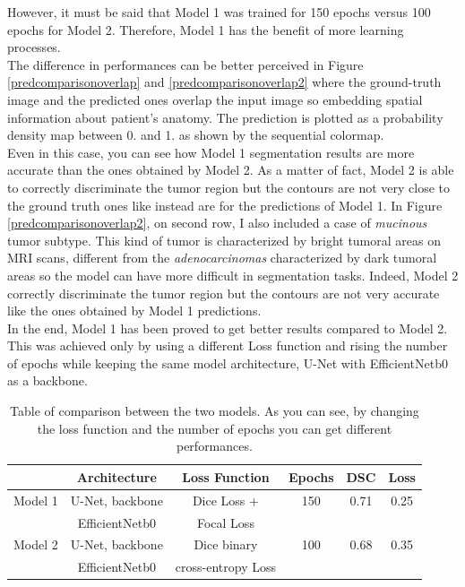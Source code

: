 \documentclass{standalone}
\begin{document}
However, it must be said that Model 1 was trained for 150 epochs versus 100 epochs for Model 2.
Therefore, Model 1 has the benefit of more learning processes.
\\
The difference in performances can be better perceived in Figure \ref{predcomparisonoverlap} and \ref{predcomparisonoverlap2} where the ground-truth image and the predicted ones overlap the input image so embedding spatial information about patient's anatomy.
The prediction is plotted as a probability density map between 0. and 1. as shown by the sequential colormap.
\\
Even in this case, you can see how Model 1 segmentation results are more accurate than the ones obtained by Model 2.
As a matter of fact, Model 2 is able to correctly discriminate the tumor region but the contours are not very close to the ground truth ones like instead are for the predictions of Model 1.
In Figure \ref{predcomparisonoverlap2}, on second row, I also included a case of \textit{mucinous} tumor subtype.
This kind of tumor is characterized by bright tumoral areas on MRI scans, different from the \textit{adenocarcinomas} characterized by dark tumoral areas so the model can have more difficult in segmentation tasks.
Indeed, Model 2 correctly discriminate the tumor region but the contours are not very accurate like the ones obtained by Model 1 predictions.
\\
In the end, Model 1 has been proved to get better results compared to Model 2.
This was achieved only by using a different Loss function and rising the number of epochs while keeping the same model architecture, U-Net with EfficientNetb0 as a backbone.

\vfill

\begin{table}[htp]
	\centering
	\begin{tabular}{lccccc}
		\toprule
		  & \textbf{Architecture} & \textbf{Loss Function} & \textbf{Epochs} & \textbf{DSC} & \textbf{Loss} \\
	    \midrule
		Model 1  & U-Net, backbone & Dice Loss +   &  150 &  0.71 & 0.25\\
                & EfficientNetb0 &    Focal Loss              &      &   &   \\
         \midrule
		Model 2  & U-Net, backbone  & Dice binary  & 100 &  0.68 & 0.35 \\
        & EfficientNetb0 &   cross-entropy Loss               &      &   &   \\

		\bottomrule
	\end{tabular}
	\caption{Table of comparison between the two models. As you can see, by changing the loss function and the number of epochs you can get different performances.}
	\label{tab:comparison}
\end{table}
\end{document}
